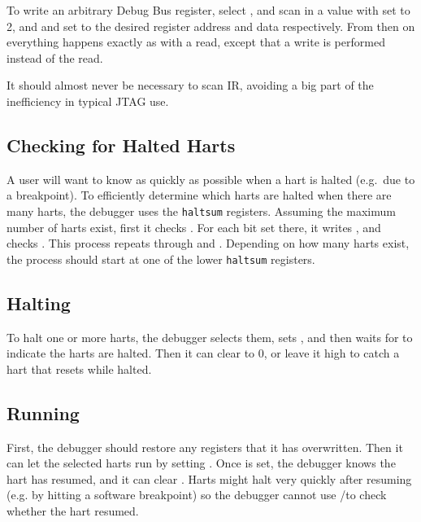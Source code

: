 To write an arbitrary Debug Bus register, select \RdtmDmi, and scan in a value
with \FdtmDmiOp set to 2, and \FdmSbaddressZeroAddress and \FdmSbdataZeroData set to the desired register
address and data respectively. From then on everything happens exactly as with
a read, except that a write is performed instead of the read.

It should almost never be necessary to scan IR, avoiding a big part of the
inefficiency in typical JTAG use.

\subsection{Checking for Halted Harts}

A user will want to know as quickly as possible when a hart is halted (e.g.\ due
to a breakpoint).  To efficiently determine which harts are halted when there
are many harts, the debugger uses the {\tt haltsum} registers. Assuming the
maximum number of harts exist, first it checks \RdmHaltsumThree. For each bit set
there, it writes \Fhartsel, and checks \RdmHaltsumTwo. This process repeats
through \RdmHaltsumOne and \RdmHaltsumZero. Depending on how many harts exist, the
process should start at one of the lower {\tt haltsum} registers.

\subsection{Halting} \label{deb:halt}

To halt one or more harts, the debugger selects them, sets \FdmDmcontrolHaltreq, and then
waits for \FdmDmstatusAllhalted to indicate the harts are halted. Then it can clear
\FdmDmcontrolHaltreq to 0, or leave it high to catch a hart that resets while halted.

\subsection{Running}

First, the debugger should restore any registers that it has overwritten.
Then it can let the selected harts run by setting \FdmDmcontrolResumereq. Once
\FdmDmstatusAllresumeack is set, the debugger knows the hart has resumed, and it can
clear \FdmDmcontrolResumereq. Harts might halt very quickly after resuming (e.g.
by hitting a software breakpoint) so the debugger cannot use
\FdmDmstatusAllhalted/\FdmDmstatusAnyhalted to check whether the hart resumed.

